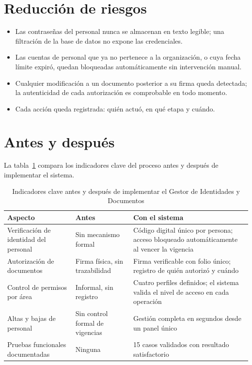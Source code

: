 \documentclass[10pt,letterpaper]{report}
\begin{document}
\section{Reducción de riesgos}

\begin{itemize}[noitemsep]
  \item Las contraseñas del personal nunca se almacenan en texto legible; una filtración de la base de datos no expone las credenciales.
  \item Las cuentas de personal que ya no pertenece a la organización, o cuya fecha límite expiró, quedan bloqueadas automáticamente sin intervención manual.
  \item Cualquier modificación a un documento posterior a su firma queda detectada; la autenticidad de cada autorización es comprobable en todo momento.
  \item Cada acción queda registrada: quién actuó, en qué etapa y cuándo.
\end{itemize}

\section{Antes y después}

La tabla~\ref{tab:metricas} compara los indicadores clave del proceso antes y después de implementar el sistema.

\begin{table}[htbp]
\centering
\caption{Indicadores clave antes y después de implementar el Gestor de Identidades y Documentos}
\label{tab:metricas}
\begin{tabular}{p{} p{} p{}}
\toprule
\textbf{Aspecto} & \textbf{Antes} & \textbf{Con el sistema} \\
\midrule
Verificación de identidad del personal &
Sin mecanismo formal &
Código digital único por persona; acceso bloqueado automáticamente al vencer la vigencia \\[4pt]
Autorización de documentos &
Firma física, sin trazabilidad &
Firma verificable con folio único; registro de quién autorizó y cuándo \\[4pt]
Control de permisos por área &
Informal, sin registro &
Cuatro perfiles definidos; el sistema valida el nivel de acceso en cada operación \\[4pt]
Altas y bajas de personal &
Sin control formal de vigencias &
Gestión completa en segundos desde un panel único \\[4pt]
Pruebas funcionales documentadas &
Ninguna &
15 casos validados con resultado satisfactorio \\
\bottomrule
\end{tabular}
\end{table}
\end{document}
